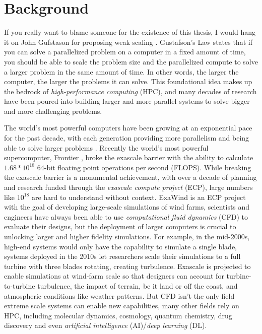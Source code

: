 
\chapter[Background]{Background}\label{ch:Background}

If you really want to blame someone for the existence of this thesis, I would hang it on John Gufstason for proposing weak scaling \cite{Gustafson1988GustafsonLaw}.
Gustafson's Law states that if you can solve a parallelized problem on a computer in a fixed amount of time, you should be able to scale the problem size and the parallelized compute to solve a larger problem in the same amount of time.
In other words, the larger the computer, the larger the problems it can solve.
This foundational idea makes up the bedrock of \textit{high-performance computing} (HPC), and many decades of research have been poured into building larger and more parallel systems to solve bigger and more challenging problems.

The world's most powerful computers have been growing at an exponential pace for the past decade, with each generation providing more parallelism and being able to solve larger problems \cite{Top500}.
Recently the world's most powerful supercomputer, Frontier \cite{Frontier}, broke the exascale barrier with the ability to calculate $1.68*10^{18}$ 64-bit floating point operations per second (FLOPS). 
While breaking the exascale barrier is a monumental achievement, with over a decade of planning and research funded through the \textit{exascale compute project} (ECP), large numbers like $10^{18}$ are hard to understand without context.
ExaWind \cite{ExaWind} is an ECP project with the goal of developing large-scale simulations of wind farms, scientists and engineers have always been able to use \textit{computational fluid dynamics} (CFD) to evaluate their designs, but the deployment of larger computers is crucial to unlocking larger and higher fidelity simulations.
For example, in the mid-2000s, high-end systems would only have the capability to simulate a single blade, systems deployed in the 2010s let researchers scale their simulations to a full turbine with three blades rotating, creating turbulence.
Exascale is projected to enable simulations at wind-farm scale so that designers can account for turbine-to-turbine turbulence, the impact of terrain, be it land or off the coast, and atmospheric conditions like weather patterns.
But CFD isn't the only field extreme scale systems can enable new capabilities, many other fields rely on HPC, including molecular dynamics, cosmology, quantum chemistry, drug discovery and even \textit{artificial intelligence} (AI)/\textit{deep learning} (DL). 

